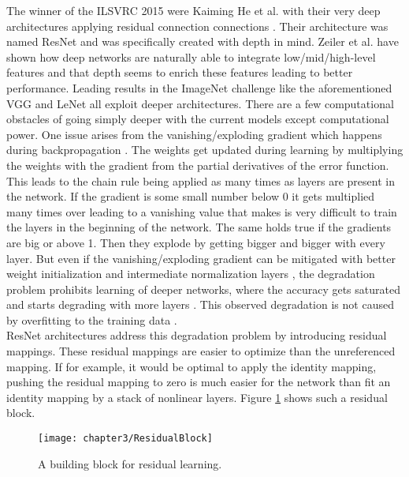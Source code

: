 The winner of the ILSVRC 2015 were Kaiming He et al. with their very deep architectures applying residual connection connections \cite{he2016deep, he2016identity}. Their architecture was named ResNet and was specifically created with depth in mind. Zeiler et al. have shown how deep networks are naturally able to integrate low/mid/high-level features and that depth seems to enrich these features leading to better performance. Leading results in the ImageNet challenge like the aforementioned VGG \cite{simonyan2014very} and LeNet \cite{szegedy2015going} all exploit deeper architectures. There are a few computational obstacles of going simply deeper with the current models except computational power. One issue arises from the vanishing/exploding gradient which happens during backpropagation \cite{glorot2010understanding}. The weights get updated during learning by multiplying the weights with the gradient from the partial derivatives of the error function. This leads to the chain rule being applied as many times as layers are present in the network. If the gradient is some small number below 0 it gets multiplied many times over leading to a vanishing value that makes is very difficult to train the layers in the beginning of the network. The same holds true if the gradients are big or above 1. Then they explode by getting bigger and bigger with every layer. But even if the vanishing/exploding gradient can be mitigated with better weight initialization and intermediate normalization layers \cite{ioffe2015batch}, the degradation problem prohibits learning of deeper networks, where the accuracy gets saturated and starts degrading with more layers \cite{he2016deep}. This observed degradation is not caused by overfitting to the training data \cite{he2015convolutional, srivastava2015highway}.\\

ResNet architectures address this degradation problem by introducing residual mappings. These residual mappings are easier to optimize than the unreferenced mapping. If for example, it would be optimal to apply the identity mapping, pushing the residual mapping to zero is much easier for the network than fit an identity mapping by a stack of nonlinear layers. Figure \ref{fig:ResidualBlock} shows such a residual block.

\begin{figure}[H]
  \centering
  \caption{A building block for residual learning. \cite{he2016deep}}
  \texttt{[image: chapter3/ResidualBlock]}
  \label{fig:ResidualBlock}
\end{figure}

